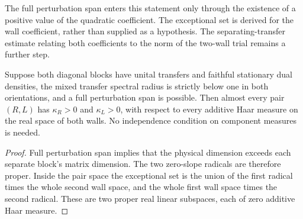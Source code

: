 The full perturbation span enters this statement only through the existence
of a positive value of the quadratic coefficient. The exceptional set is
derived for the wall coefficient, rather than supplied as a
hypothesis. The separating-transfer estimate relating both coefficients
to the norm of the two-wall trial remains a further step.

\begin{lemma}
    \label{cor:uncle_wall_gram_pair_generic_positive}
    \leanok
    Suppose both diagonal blocks have unital transfers and faithful
    stationary dual densities, the mixed transfer spectral radius is
    strictly below one in both orientations, and a full perturbation
    span is possible. Then almost every pair $(R,L)$ has
    $\kappa_R>0$ and $\kappa_L>0$, with respect to every additive Haar
    measure on the real space of both walls. No independence condition
    on component measures is needed.
\end{lemma}
\begin{proof}
    \leanok
    Full perturbation span implies that the physical dimension exceeds
    each separate block's matrix dimension. The two zero-slope radicals
    are therefore proper. Inside the pair space the exceptional set is
    the union of the first radical times the whole second wall space,
    and the whole first wall space times the second radical. These are
    two proper real linear subspaces, each of zero additive Haar measure.
\end{proof}

